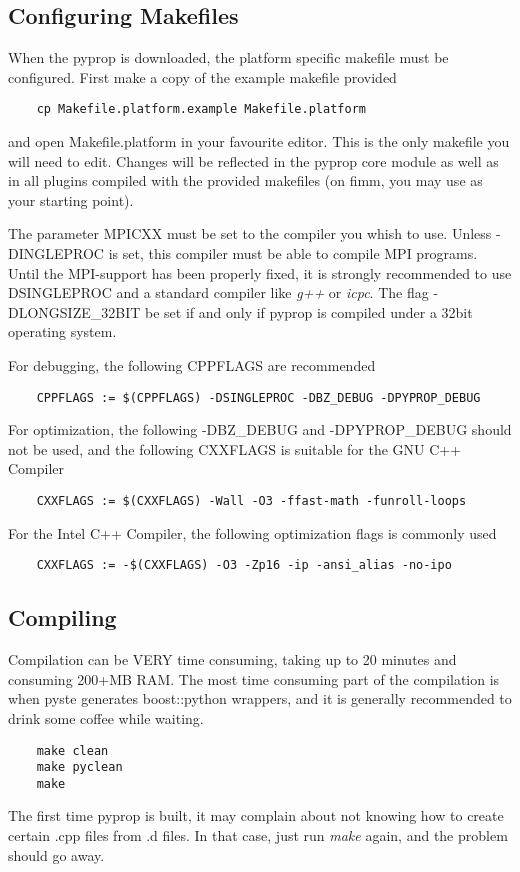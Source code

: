 \subsection*{Configuring Makefiles}
When the pyprop is downloaded, the platform specific makefile must be configured. First make
a copy of the example makefile provided
\begin{verbatim}
	cp Makefile.platform.example Makefile.platform
\end{verbatim}
and open Makefile.platform in your favourite editor. This is the only makefile you will need to edit. 
Changes will be reflected in the pyprop core module as well as in all plugins compiled with the provided
makefiles (on fimm, you may use  as your starting point).

The parameter MPICXX must be set to the compiler you whish to use. Unless -DINGLEPROC is set, this compiler
must be able to compile MPI programs. Until the MPI-support has been properly fixed, it is strongly recommended
to use \-DSINGLEPROC and a standard compiler like \textit{g++} or \textit{icpc}.
The flag -DLONGSIZE\_32BIT be set if and only if pyprop is compiled under a 32bit operating system.

For debugging, the following CPPFLAGS are recommended
\begin{verbatim}
	CPPFLAGS := $(CPPFLAGS) -DSINGLEPROC -DBZ_DEBUG -DPYPROP_DEBUG
\end{verbatim}
For optimization, the following -DBZ\_DEBUG and -DPYPROP\_DEBUG should not be used, and the following
CXXFLAGS is suitable for the GNU C++ Compiler
\begin{verbatim}
	CXXFLAGS := $(CXXFLAGS) -Wall -O3 -ffast-math -funroll-loops
\end{verbatim}
For the Intel C++ Compiler, the following optimization flags is commonly used
\begin{verbatim}
	CXXFLAGS := -$(CXXFLAGS) -O3 -Zp16 -ip -ansi_alias -no-ipo
\end{verbatim}

\subsection*{Compiling}
Compilation can be VERY time consuming, taking up to 20 minutes and consuming 200+MB RAM. 
The most time consuming part of the compilation is when pyste generates boost::python wrappers, and
it is generally recommended to drink some coffee while waiting.
\begin{verbatim}
	make clean
	make pyclean
	make
\end{verbatim}
The first time pyprop is built, it may complain about not knowing how to create certain .cpp files from
.d files. In that case, just run \textit{make} again, and the problem should go away.


